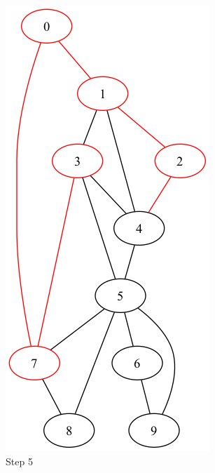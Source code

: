 \documentclass[a4paper,11pt]{report}
\begin{document}
\begin{figure}[htbp]
\begin{subfigure}[b]{0.3\textwidth}
        \includegraphics[height=0.29\textheight]{notebook/assets/aufgabe_07_fleury_step_4.png}
        \caption{Step 5}
        \label{fig:fleury_step_5}
    \end{subfigure}
    \hfill
    \begin{subfigure}[b]{0.3\textwidth}

\end{subfigure}
\end{figure}
\end{document}
